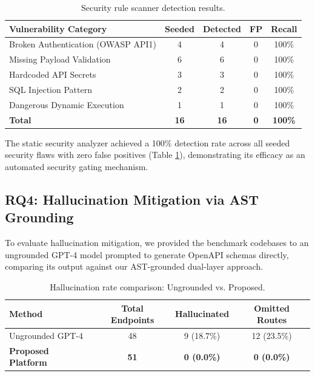 \documentclass[a4paper,10pt]{article}
\begin{document}
\begin{table}[t]
\caption{Security rule scanner detection results.}
\label{tab:security}
\centering
\fontsize{8pt}{10pt}\selectfont
\begin{tabular}{lcccc}
\toprule
\textbf{Vulnerability Category} & \textbf{Seeded} & \textbf{Detected} & \textbf{FP} & \textbf{Recall} \\
\midrule
Broken Authentication (OWASP API1) & 4 & 4 & 0 & 100\% \\
Missing Payload Validation         & 6 & 6 & 0 & 100\% \\
Hardcoded API Secrets              & 3 & 3 & 0 & 100\% \\
SQL Injection Pattern              & 2 & 2 & 0 & 100\% \\
Dangerous Dynamic Execution        & 1 & 1 & 0 & 100\% \\
\midrule
\textbf{Total}                     & \textbf{16} & \textbf{16} & \textbf{0} & \textbf{100\%} \\
\bottomrule
\end{tabular}
\end{table}

The static security analyzer achieved a 100\% detection rate across all seeded security flaws with zero false positives (Table \ref{tab:security}), demonstrating its efficacy as an automated security gating mechanism.

\subsection{RQ4: Hallucination Mitigation via AST Grounding}
\noindent
To evaluate hallucination mitigation, we provided the benchmark codebases to an ungrounded GPT-4 model prompted to generate OpenAPI schemas directly, comparing its output against our AST-grounded dual-layer approach.

\begin{table}[t]
\caption{Hallucination rate comparison: Ungrounded vs. Proposed.}
\label{tab:hallucination}
\centering
\fontsize{8pt}{10pt}\selectfont
\begin{tabular}{lccc}
\toprule
\textbf{Method} & \textbf{Total Endpoints} & \textbf{Hallucinated} & \textbf{Omitted Routes} \\
\midrule
Ungrounded GPT-4  & 48 & 9 (18.7\%) & 12 (23.5\%) \\
\textbf{Proposed Platform} & \textbf{51} & \textbf{0 (0.0\%)} & \textbf{0 (0.0\%)} \\
\bottomrule
\end{tabular}
\end{table}
\end{document}
